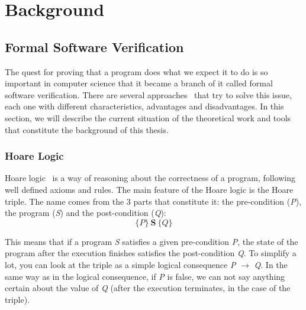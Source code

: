 
%

\chapter{Background}
\label{cha:background}

\glsresetall


\section{Formal Software Verification}
\label{sec:formal_software_verification}

The quest for proving that a program does what we expect it to do is so important in computer science that it became a branch of it called formal software verification. 
There are several approaches~\cite{DBLP:conf/fm/BrainP24} that try to solve this issue, each one with different characteristics, advantages and disadvantages. 
In this section, we will describe the current situation of the theoretical work and tools that constitute the background of this thesis.


\subsection{Hoare Logic} 
\label{sub:hoare_logic}

Hoare logic~\cite{hoare69} is a way of reasoning about the correctness of a program, following well defined axioms and rules.
The main feature of the Hoare logic is the Hoare triple. 
The name comes from the 3 parts that constitute it: the pre-condition (\emph{P}), the program (\emph{S}) and the post-condition (\emph{Q}):
\[ \{P\} \ \textbf{S} \ \{Q\} \]

This means that if a program \emph{S} satisfies a given pre-condition \emph{P}, the state of the program after the execution finishes satisfies the post-condition \emph{Q}.
To simplify a lot, you can look at the triple as a simple logical consequence \emph{P} $\rightarrow$ \emph{Q}.
In the same way as in the logical consequence, if \emph{P} is false, we can not say anything certain about the value of \emph{Q} (after the execution terminates, in the case of the triple).

